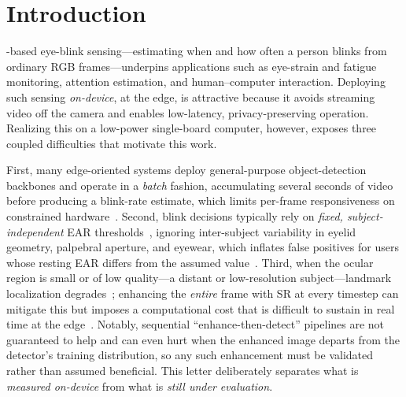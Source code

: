 \documentclass{IEEE_lsens}
\begin{document}
\maketitle

\section{Introduction}
-based eye-blink sensing---estimating when and how often
a person blinks from ordinary RGB frames---underpins applications such as
eye-strain and fatigue monitoring, attention estimation, and human--computer
interaction. Deploying such sensing \emph{on-device}, at the edge, is
attractive because it avoids streaming video off the camera and enables
low-latency, privacy-preserving operation. Realizing this on a low-power
single-board computer, however, exposes three coupled difficulties that
motivate this work.

First, many edge-oriented systems deploy general-purpose object-detection
backbones and operate in a \emph{batch} fashion, accumulating several seconds
of video before producing a blink-rate estimate, which limits per-frame
responsiveness on constrained hardware~\cite{carcellar2024,reddy2019}. Second,
blink decisions typically rely on \emph{fixed, subject-independent} EAR
thresholds~\cite{soukupova2016}, ignoring inter-subject variability in eyelid
geometry, palpebral aperture, and eyewear, which inflates false positives for
users whose resting EAR differs from the assumed value~\cite{drowsy2025}. Third,
when the ocular region is small or of low quality---a distant or low-resolution
subject---landmark localization degrades~\cite{bulat2018}; enhancing the
\emph{entire} frame with SR at every timestep can mitigate this but imposes a
computational cost that is difficult to sustain in real time at the
edge~\cite{dong2016}. Notably, sequential ``enhance-then-detect'' pipelines are
not guaranteed to help and can even hurt when the enhanced image departs from
the detector's training distribution, so any such enhancement must be validated
rather than assumed beneficial. This letter deliberately separates what is
\emph{measured on-device} from what is \emph{still under evaluation}.
\end{document}
